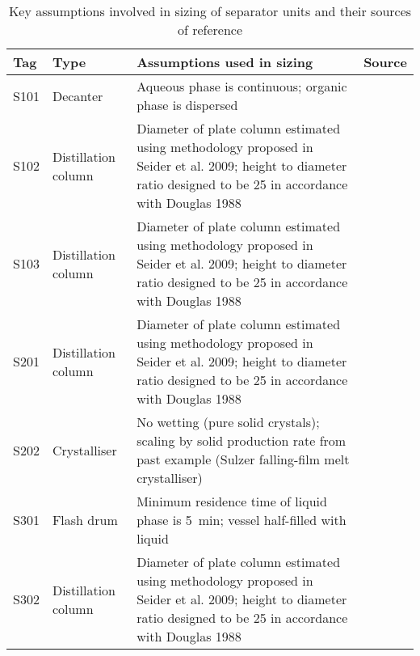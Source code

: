 \begin{table}[h]
\centering\small
    \caption{Key assumptions involved in sizing of separator units and their sources of reference}
    \label{tab:assumptions of sizing separator units}\footnotesize
\begin{tabularx}{\linewidth}{llXl}
\toprule
Tag  & Type                 & Assumptions used in sizing                                                                                                                                      & Source                                             \\ \midrule
S101 & Decanter             & Aqueous phase is continuous; organic phase is dispersed                                                                                                         & \cite{ludwig_applied_1994}                         \\
S102 & Distillation column  & Diameter of plate column estimated using methodology proposed in Seider et al. 2009; height to diameter ratio designed to be 25 in accordance with Douglas 1988 & \cite{seider_product_2009,douglas_conceptual_1988} \\
S103 & Distillation column  & Diameter of plate column estimated using methodology proposed in Seider et al. 2009; height to diameter ratio designed to be 25 in accordance with Douglas 1988 & \cite{seider_product_2009,douglas_conceptual_1988} \\
S201 & Distillation column  & Diameter of plate column estimated using methodology proposed in Seider et al. 2009; height to diameter ratio designed to be 25 in accordance with Douglas 1988 & \cite{seider_product_2009,douglas_conceptual_1988} \\
S202 & Crystalliser         & No wetting (pure solid crystals); scaling by solid production rate from past example (Sulzer falling-film melt crystalliser)                                    & \cite{seader_separation_2011}                      \\
S301 & Flash drum           & Minimum residence time of liquid phase is \SI{5}{\minute}; vessel half-filled with liquid                                                                                 & \cite{seader_separation_2011}                      \\
S302 & Distillation column  & Diameter of plate column estimated using methodology proposed in Seider et al. 2009; height to diameter ratio designed to be 25 in accordance with Douglas 1988 & \cite{seider_product_2009,douglas_conceptual_1988} \\

\end{tabularx}
\end{table}
